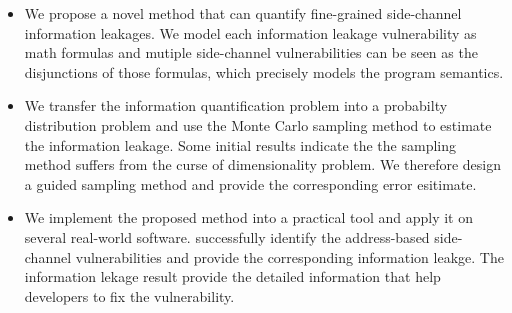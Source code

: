 \begin{itemize}
	\item We propose a novel method that can quantify fine-grained side-channel
        information leakages. We model each information leakage vulnerability as math formulas and 
        mutiple side-channel vulnerabilities can be seen as the disjunctions of those formulas, which
        precisely models the program semantics.
        \item We transfer the information quantification problem into a probabilty distribution problem and 
        use the Monte Carlo sampling method to estimate the information leakage. Some initial results indicate the 
        the sampling method suffers from the curse of dimensionality problem. We therefore design a guided
        sampling method and provide the corresponding error esitimate.
	\item We implement the proposed method into a practical tool and apply it on several real-world software. \tool{} 
        successfully identify the address-based side-channel vulnerabilities and provide the corresponding
        information leakge. The information lekage result provide the detailed information that help developers
        to fix the vulnerability.
\end{itemize}



